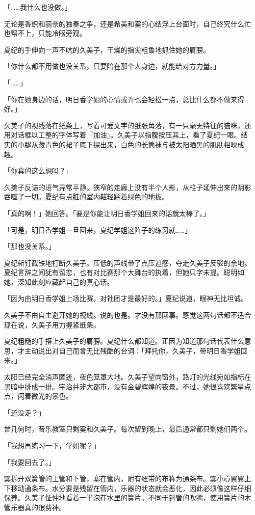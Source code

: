 \documentclass[UTF8]{ctexart}
\begin{document}
    「……我什么也没做。」 

    无论是香织和丽奈的独奏之争，还是希美和霙的心结浮上台面时，自己终究什么忙也帮不上，只能冷眼旁观。 

    夏纪的手伸向一声不吭的久美子，干燥的指尖粗鲁地抓住她的肩膀。 

    「你什么都不用做也没关系，只要陪在那个人身边，就能给对方力量。」 

    「……」 

    「你在她身边的话，明日香学姐的心情或许也会轻松一点，总比什么都不做来得好。」 

    久美子的视线落在纸条上，写着可爱文字的纸张角落，有一只毫无特征的猫咪，还用对话框以工整的字体写着「加油」。久美子以指腹按压其上，看了夏纪一眼。结实的小腿从藏青色的裙子底下探出来，白色的长筒袜与被太阳晒黑的肌肤相映成趣。 

    「你真的这么想吗？」 

    久美子反诘的语气异常平静。狭窄的走廊上没有半个人影，从柱子延伸出来的阴影吞噬了一切。夏纪有点脏的室内鞋轻踹着绿色的地板。 

    「真的啊！」她回答。「要是你能让明日香学姐回来的话就太棒了。」 

    「可是，明日香学姐一旦回来，夏纪学姐这阵子的练习就……」 

    「那也没关系。」 

    夏纪斩钉截铁地打断久美子。压低的声线带了点压迫感，夺走久美子反驳的余地。夏纪言辞之间犹有留恋，也有对比赛那个大舞台的执着，但她只字未提。聪明如她，深知此刻应藏起自己的真心话。 

    「因为由明日香学姐上场比赛，对社团才是最好的。」夏纪说道，眼神无比坦诚。 

    久美子不由自主避开她的视线。说的也是。才没有那回事。感觉这两句话都不适合现在说，久美子用力握紧纸条。 

    夏纪粗糙的手搭上久美子的肩膀。夏纪什么都知道。正因为知道那句话代表什么意思，才主动说出对自己而言无比残酷的台词：「拜托你，久美子，带明日香学姐回来。」 

    太阳已经完全消声匿迹，夜色笼罩大地。久美子望向窗外，路灯的光线宛如指标在黑暗中排成一排。宇治并非大都市，没有金碧辉煌的夜景。不过，她很喜欢繁星点点，闪着微光的景色。 

    「还没走？」 

    曾几何时，音乐教室只剩霙和久美子。每次留到晚上，最后通常都只剩她们两个。 

    「我想再练习一下，学姐呢？」 

    「我要回去了。」 

    霙拆开双簧管的上管和下管，塞在管内，附有纽带的布称为通条布。霙小心翼翼上下移动通条布。水分要是残留在管内，乐器的状态就会恶化，因此必须像这样仔细保养。久美子怔忡地看着一半泡在水里的簧片。不同于铜管的吹嘴，使用簧片的木管乐器真的很费神。 
\end{document}
